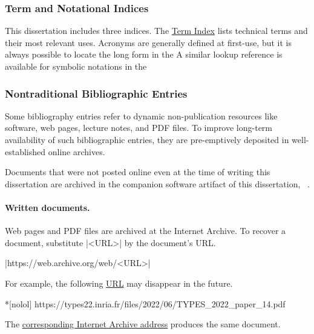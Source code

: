 \subsubsection{Term and Notational Indices}

This dissertation includes three indices.
The \hyperref[sec:app:index]{Term Index} lists technical terms and their most relevant uses.
Acronyms are generally defined at first-use, but it is always possible to locate the long form in the %
A similar lookup reference is available for symbolic notations in the %

\subsubsection{Nontraditional Bibliographic Entries}

Some bibliography entries refer to dynamic non-publication resources like software, web pages, lecture notes, and PDF files.
To improve long-term availability of such bibliographic entries, they are pre-emptively deposited in well-established online archives.

Documents that were not posted online even at the time of writing this dissertation are archived in the companion software artifact of this dissertation, \cf~.

\paragraph*{Written documents.}
Web pages and PDF files are archived at the Internet Archive.
To recover a document, substitute \pr|<URL>| by the document's URL\@.
\begin{center}
\pr|https://web.archive.org/web/<URL>|
\end{center}

For example, the following \href{https://types22.inria.fr/files/2022/06/TYPES_2022_paper_14.pdf}{URL} may disappear in the future.

\begin{center}
\begin{minipage}{\textwidth}
\begin{cmdlisting}*[nolol]
https://types22.inria.fr/files/2022/06/TYPES_2022_paper_14.pdf
\end{cmdlisting}
\end{minipage}
\end{center}

The \href{https://web.archive.org/web/https://types22.inria.fr/files/2022/06/TYPES_2022_paper_14.pdf}{corresponding Internet Archive address} produces the same document.

